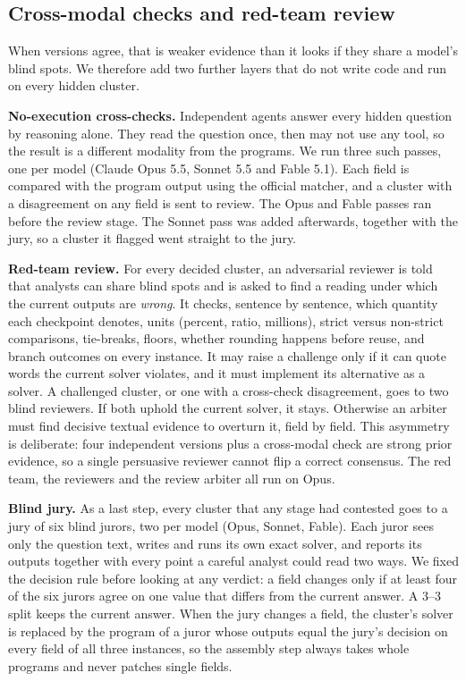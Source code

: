 \documentclass[conference]{IEEEtran}
\begin{document}
\subsection{Cross-modal checks and red-team review}\label{sec:redteam}
When versions agree, that is weaker evidence than it looks if they share a model's blind spots. We therefore add two
further layers that do not write code and run on every hidden cluster.

\textbf{No-execution cross-checks.} Independent agents answer every hidden question by reasoning alone. They read the
question once, then may not use any tool, so the result is a different modality from the programs. We run three such
passes, one per model (Claude Opus 5.5, Sonnet 5.5 and Fable 5.1). Each field is compared with the program output using the
official matcher, and a cluster with a disagreement on any field is sent to review. The Opus and Fable passes ran
before the review stage. The Sonnet pass was added afterwards, together with the jury, so a cluster it flagged went
straight to the jury.

\textbf{Red-team review.} For every decided cluster, an adversarial reviewer is told that analysts can share blind
spots and is asked to find a reading under which the current outputs are \emph{wrong}. It checks, sentence by sentence,
which quantity each checkpoint denotes, units (percent, ratio, millions), strict versus non-strict comparisons,
tie-breaks, floors, whether rounding happens before reuse, and branch outcomes on every instance. It may raise a
challenge only if it can quote words the current solver violates, and it must implement its alternative as a solver.
A challenged cluster, or one with a cross-check disagreement, goes to two blind reviewers. If both uphold the current
solver, it stays. Otherwise an arbiter must find decisive textual evidence to overturn it, field by field. This
asymmetry is deliberate: four independent versions plus a cross-modal check are strong prior evidence, so a single
persuasive reviewer cannot flip a correct consensus. The red team, the reviewers and the review arbiter all run on Opus.

\textbf{Blind jury.} As a last step, every cluster that any stage had contested goes to a jury of six blind jurors, two
per model (Opus, Sonnet, Fable). Each juror sees only the question text, writes and runs its own exact solver,
and reports its outputs together with every point a careful analyst could read two ways. We fixed the decision rule
before looking at any verdict: a field changes only if at least four of the six jurors agree on one value that
differs from the current answer. A 3--3 split keeps the current answer. When the jury changes a field, the cluster's
solver is replaced by the program of a juror whose outputs equal the jury's decision on every field of all three
instances, so the assembly step always takes whole programs and never patches single fields.
\end{document}
